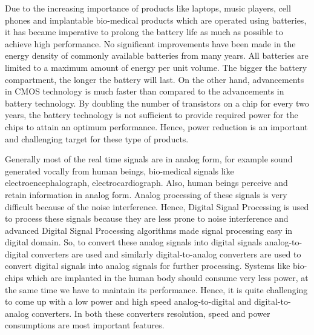 \begin{center}
\abstract
\end{center}

\par
\hspace{0.5cm} Due to the increasing importance of products like laptops, music players, cell phones and implantable bio-medical products which are operated using batteries, it has became imperative to prolong the battery life as much as possible to achieve high performance. No significant improvements have been made in the energy density of commonly available batteries from many years. All batteries are limited to a maximum amount of energy per unit volume. The bigger the battery compartment, the longer the battery will last. On the other hand, advancements in CMOS technology is much faster than compared to the advancements in battery technology. By doubling the number of transistors on a chip for every two years, the battery technology is not sufficient to provide required power for the chips to attain an optimum performance. Hence, power reduction is an important and challenging target for these type of products.

\par
\hspace{0.5cm} Generally most of the real time signals are in analog form, for example sound generated vocally from human beings, bio-medical signals like electroencephalograph, electrocardiograph. Also, human beings perceive and retain information in analog form. Analog processing of these signals is very difficult because of the noise interference. Hence, Digital Signal Processing is used to process these signals because they are less prone to noise interference and advanced Digital Signal Processing algorithms made signal processing easy in digital domain. So, to convert these analog signals into digital signals analog-to-digital converters are used and similarly digital-to-analog converters are used to convert digital signals into analog signals for further processing. Systems like bio-chips which are implanted in the human body should consume very less power, at the same time we have to maintain its performance. Hence, it is quite challenging to come up with a low power and high speed analog-to-digital and digital-to-analog converters. In both these converters resolution, speed and power consumptions are most important features.

